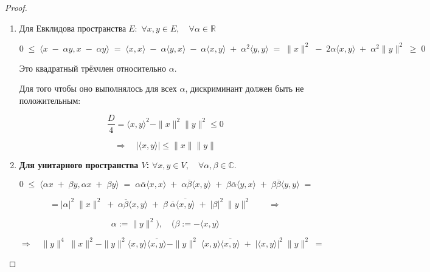 \vspace{0.2cm}
\begin{proof}



    \begin{enumerate}
        \item 
        
        $\textbf{Для Евклидова пространства} \; E:$ \; $\forall x, y \in E, \quad \forall \alpha \in \mathbb{R}$
        
        $$0 \; \leq \; \langle x \; - \; \alpha y, x \; - \; \alpha y \rangle \; = \; \langle x, x \rangle \; - \; \alpha \langle y, x \rangle \; - \; \alpha \langle x, y \rangle \; + \; \alpha^2 \langle y, y \rangle \; = \; \|x\|^2 \; - \; 2 \alpha \langle x, y \rangle \; + \; \alpha^2 \|y\|^2 \; \geq \; 0$$
        
        Это квадратный трёхчлен относительно \( \alpha \). 
        
        Для того чтобы оно выполнялось для всех \( \alpha \), дискриминант должен быть не положительным:
        
        $$\frac{D}{4} = \langle x, y \rangle^2 - \|x\|^2 \|y\|^2 \leq 0$$
        
        
        $$\Longrightarrow \quad |\langle x, y \rangle| \leq \|x\| \|y\|$$
        
    \item \textbf{Для унитарного пространства \( V \):} \quad $\forall x, y \in V, \quad \forall \alpha, \beta \in \mathbb{C}$.
        
        $$0 \; \leq \; \langle \alpha x \; + \; \beta y, \alpha x \; + \; \beta y \rangle \; = \; \alpha \overline{\alpha} \langle x, x \rangle \; + \; \alpha \overline{\beta} \langle x, y \rangle \; + \; \beta \overline{\alpha} \langle y, x \rangle \; + \; \beta \overline{\beta} \langle y, y \rangle \; =$$
        
        $$= |\alpha|^2 \; \|x\|^2 \; + \; \alpha \overline{\beta} \langle x, y \rangle \; + \; \beta \; \overline{\alpha} \overline{\langle x, y \rangle } \; + \; |\beta|^2 \; \|y\|^2 \qquad \Longrightarrow$$
        
        $$\alpha := \|y\|^2 ) , \quad ( \beta := -\langle x, y \rangle$$
 
        $$\Longrightarrow \quad \|y\|^4 \; \|x\|^2 - \|y\|^2 \langle x, y \rangle \overline{\langle x, y \rangle} - \|y\|^2 \; \langle x, y \rangle \overline{\langle x, y \rangle} \; + \; |\langle x, y \rangle |^2 \; \|y\|^2 \; =$$
        

\end{enumerate}
\end{proof}
